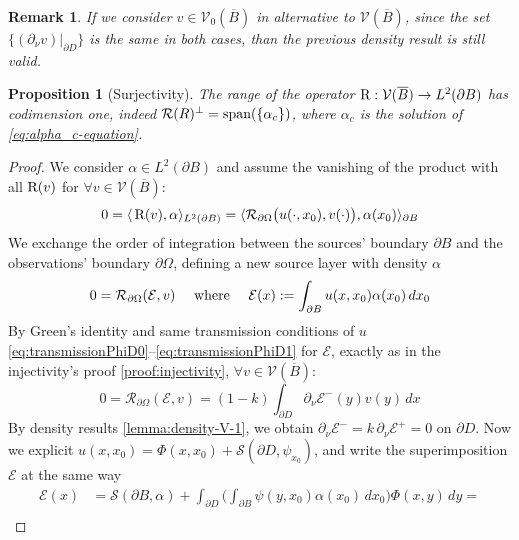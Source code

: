 \documentclass[10pt, a4paper, twoside, openright]{book}
\theoremstyle{definition}
\theoremstyle{plain}
\theoremstyle{plain}
\theoremstyle{plain}
\newtheorem{proposition}[subsection]{Proposition}
\theoremstyle{plain}
\newtheorem{remark}[subsection]{Remark}
\theoremstyle{plain}
\theoremstyle{plain}
\theoremstyle{plain}
\theoremstyle{plain}
\begin{document}
\begin{remark}
 If we consider $v\in\mathcal{V}_0(\overline{B})$ in alternative to $\mathcal{V}(\overline{B})$,  since the set $\{(\partial_\nu v )|_{\partial D}\}$ is the same in both cases, than the previous density result is still valid.
\end{remark}
\begin{proposition}[Surjectivity]
\label{prop:surjectivity}
 The range of the operator $\textup{R} : \mathcal{V}(\overline{B})\to L^2(\partial B)$  has codimension one, indeed $\mathcal{R}(R)^\perp=\textup{span}(\{\alpha_c\})$, where $\alpha_c$ is the solution of \eqref{eq:alpha_c-equation}.
\end{proposition}
\begin{proof}
\label{proof:surjectivity}
 We consider $\alpha\in L^2(\partial B)$ and assume the vanishing of the product with all $\textup{R}(v)$ for $\forall v\in\mathcal{V}(\overline{B})$:
 \begin{equation*}
  0 =\langle\,\textup{R}(v), \alpha\rangle_{L^2(\partial B)} = \langle \mathcal{R}_{\partial\Omega}\bigl(u(\cdot,x_0),v(\cdot)\bigr), \alpha(x_0)\rangle_{\partial B}
 \end{equation*}
 We exchange the order of integration between the sources' boundary $\partial B$ and the observations' boundary $\partial \Omega$, defining a new source layer with density $\alpha$ 
 \begin{equation}
  0 = \mathcal{R}_{\partial \Omega}(\mathcal{E},v)\quad\textup{ where }\quad\mathcal{E}(x):=\int_{\partial B}u(x,x_0)\alpha(x_0)\, dx_0
 \end{equation}
 By Green's identity and same transmission conditions of $u$ \eqref{eq:transmissionPhiD0}--\eqref{eq:transmissionPhiD1} for $\mathcal{E}$, exactly as in the injectivity's proof \ref{proof:injectivity}, $\forall v \in \mathcal{V}(\overline{B})$:
 \begin{equation}
  0 = \mathcal{R}_{\partial \Omega}(\mathcal{E},v)=(1-k)\int_{\partial D} \partial_\nu\mathcal{E}^-(y)v(y)\,dx
 \end{equation}
 By density results \ref{lemma:density-V-1}, we obtain $\partial_\nu\mathcal{E}^- = k\,\partial_\nu\mathcal{E}^+= 0$ on $\partial D$. 
 Now we explicit $u(x,x_0)=\Phi(x,x_0)+\mathcal{S}(\partial D, \psi_{x_0})$, and write the superimposition $\mathcal{E}$ at the same way
 \begin{align}
  \mathcal{E}(x)&=\mathcal{S}(\partial B, \alpha) + \int_{\partial D} \Big(\int_{\partial B}\psi(y,x_0)\alpha(x_0)\,dx_0\Big)\Phi(x,y)\,dy = \\

\end{align}
\end{proof}
\end{document}
